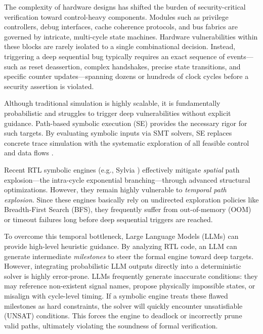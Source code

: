 \documentclass[conference]{IEEEtran}
\begin{document}
The complexity of hardware designs has shifted the burden of security-critical verification toward control-heavy components. Modules such as privilege controllers, debug interfaces, cache coherence protocols, and bus fabrics are governed by intricate, multi-cycle state machines\cite{chen_challenges_2017}. Hardware vulnerabilities within these blocks are rarely isolated to a single combinational decision. Instead, triggering a deep sequential bug typically requires an exact sequence of events—such as reset deassertion, complex handshakes, precise state transitions, and specific counter updates—spanning dozens or hundreds of clock cycles before a security assertion is violated\cite{farahmandi_system--chip_2020}. 

Although traditional simulation is highly scalable, it is fundamentally probabilistic and struggles to trigger deep vulnerabilities without explicit guidance. Path-based symbolic execution (SE) provides the necessary rigor for such targets. By evaluating symbolic inputs via SMT solvers, SE replaces concrete trace simulation with the systematic exploration of all feasible control and data flows \cite{introduction_1}.

Recent RTL symbolic engines (e.g., Sylvia \cite{Ryan2023Sylvia}) effectively mitigate \textit{spatial} path explosion—the intra-cycle exponential branching—through advanced structural optimizations. However, they remain highly vulnerable to \textit{temporal path explosion}. Since these engines basically rely on undirected exploration policies like Breadth-First Search (BFS), they frequently suffer from out-of-memory (OOM) or timeout failures long before deep sequential triggers are reached.%

To overcome this temporal bottleneck, Large Language Models (LLMs) can provide high-level heuristic guidance. By analyzing RTL code, an LLM can generate intermediate \textit{milestones} to steer the formal engine toward deep targets. However, integrating probabilistic LLM outputs directly into a deterministic solver is highly error-prone. LLMs frequently generate inaccurate conditions: they may reference non-existent signal names, propose physically impossible states, or misalign with cycle-level timing. If a symbolic engine treats these flawed milestones as hard constraints, the solver will quickly encounter unsatisfiable (UNSAT) conditions. This forces the engine to deadlock or incorrectly prune valid paths, ultimately violating the soundness of formal verification.
\end{document}
